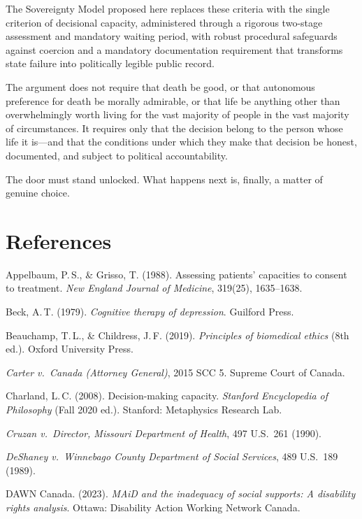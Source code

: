 \documentclass[11pt, letterpaper]{article}
\begin{document}
The Sovereignty Model proposed here replaces these criteria with the single criterion
of decisional capacity, administered through a rigorous two-stage assessment and
mandatory waiting period, with robust procedural safeguards against coercion and a
mandatory documentation requirement that transforms state failure into politically
legible public record.

The argument does not require that death be good, or that autonomous preference for
death be morally admirable, or that life be anything other than overwhelmingly worth
living for the vast majority of people in the vast majority of circumstances. It
requires only that the decision belong to the person whose life it is---and that the
conditions under which they make that decision be honest, documented, and subject to
political accountability.

The door must stand unlocked. What happens next is, finally, a matter of genuine choice.

\bigskip
\section*{References}
\setlength{\parskip}{5pt}
\setlength{\parindent}{0pt}
\small

Appelbaum, P.\,S., \& Grisso, T. (1988). Assessing patients' capacities to consent to
treatment. \textit{New England Journal of Medicine}, 319(25), 1635--1638.

Beck, A.\,T. (1979). \textit{Cognitive therapy of depression}. Guilford Press.

Beauchamp, T.\,L., \& Childress, J.\,F. (2019). \textit{Principles of biomedical ethics}
(8th ed.). Oxford University Press.

\textit{Carter v.\ Canada (Attorney General)}, 2015 SCC 5. Supreme Court of Canada.

Charland, L.\,C. (2008). Decision-making capacity.
\textit{Stanford Encyclopedia of Philosophy} (Fall 2020 ed.).
Stanford: Metaphysics Research Lab.

\textit{Cruzan v.\ Director, Missouri Department of Health}, 497 U.S.\ 261 (1990).

\textit{DeShaney v.\ Winnebago County Department of Social Services}, 489 U.S.\ 189 (1989).

DAWN Canada. (2023). \textit{MAiD and the inadequacy of social supports:
A disability rights analysis}. Ottawa: Disability Action Working Network Canada.
\end{document}
